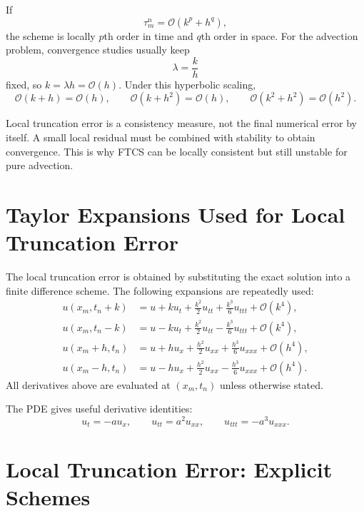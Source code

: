 \documentclass[11pt]{article}
\newcommand{\Oh}{\mathcal{O}}
\begin{document}
If
\begin{equation}
    \tau_m^n=\Oh(k^p+h^q),
\end{equation}
the scheme is locally $p$th order in time and $q$th order in space.  For the
advection problem, convergence studies usually keep
\begin{equation}
    \lambda=\frac{k}{h}
\end{equation}
fixed, so $k=\lambda h=\Oh(h)$.  Under this hyperbolic scaling,
\begin{equation}
    \Oh(k+h)=\Oh(h),\qquad
    \Oh(k+h^2)=\Oh(h),\qquad
    \Oh(k^2+h^2)=\Oh(h^2).
\end{equation}

Local truncation error is a consistency measure, not the final numerical error by
itself.  A small local residual must be combined with stability to obtain convergence.
This is why FTCS can be locally consistent but still unstable for pure advection.

\section{Taylor Expansions Used for Local Truncation Error}

The local truncation error is obtained by substituting the exact solution into a finite difference scheme.  The following expansions are repeatedly used:
\begin{align}
    u(x_m,t_n+k)
    &=u+k u_t+\frac{k^2}{2}u_{tt}+\frac{k^3}{6}u_{ttt}+\Oh(k^4),\\
    u(x_m,t_n-k)
    &=u-k u_t+\frac{k^2}{2}u_{tt}-\frac{k^3}{6}u_{ttt}+\Oh(k^4),\\
    u(x_m+h,t_n)
    &=u+h u_x+\frac{h^2}{2}u_{xx}+\frac{h^3}{6}u_{xxx}+\Oh(h^4),\\
    u(x_m-h,t_n)
    &=u-h u_x+\frac{h^2}{2}u_{xx}-\frac{h^3}{6}u_{xxx}+\Oh(h^4).
\end{align}
All derivatives above are evaluated at $(x_m,t_n)$ unless otherwise stated.

The PDE gives useful derivative identities:
\begin{equation}
    u_t=-a u_x,\qquad
    u_{tt}=a^2u_{xx},\qquad
    u_{ttt}=-a^3u_{xxx}.
\end{equation}

\section{Local Truncation Error: Explicit Schemes}
\end{document}
